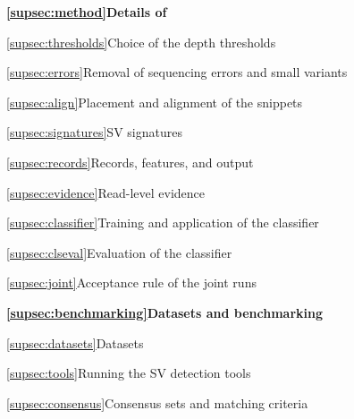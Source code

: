 \medskip\noindent\textbf{\ref{supsec:method}\quad Details of \tool{}}\dotfill\pageref{supsec:method}\par
\noindent\hspace{1.5em}\ref{supsec:thresholds}\quad Choice of the depth thresholds\dotfill\pageref{supsec:thresholds}\par
\noindent\hspace{1.5em}\ref{supsec:errors}\quad Removal of sequencing errors and small variants\dotfill\pageref{supsec:errors}\par
\noindent\hspace{1.5em}\ref{supsec:align}\quad Placement and alignment of the snippets\dotfill\pageref{supsec:align}\par
\noindent\hspace{1.5em}\ref{supsec:signatures}\quad SV signatures\dotfill\pageref{supsec:signatures}\par
\noindent\hspace{1.5em}\ref{supsec:records}\quad Records, features, and output\dotfill\pageref{supsec:records}\par
\noindent\hspace{1.5em}\ref{supsec:evidence}\quad Read-level evidence\dotfill\pageref{supsec:evidence}\par
\noindent\hspace{1.5em}\ref{supsec:classifier}\quad Training and application of the classifier\dotfill\pageref{supsec:classifier}\par
\noindent\hspace{1.5em}\ref{supsec:clseval}\quad Evaluation of the classifier\dotfill\pageref{supsec:clseval}\par
\noindent\hspace{1.5em}\ref{supsec:joint}\quad Acceptance rule of the joint runs\dotfill\pageref{supsec:joint}\par
\medskip\noindent\textbf{\ref{supsec:benchmarking}\quad Datasets and benchmarking}\dotfill\pageref{supsec:benchmarking}\par
\noindent\hspace{1.5em}\ref{supsec:datasets}\quad Datasets\dotfill\pageref{supsec:datasets}\par
\noindent\hspace{1.5em}\ref{supsec:tools}\quad Running the SV detection tools\dotfill\pageref{supsec:tools}\par
\noindent\hspace{1.5em}\ref{supsec:consensus}\quad Consensus sets and matching criteria\dotfill\pageref{supsec:consensus}\par

